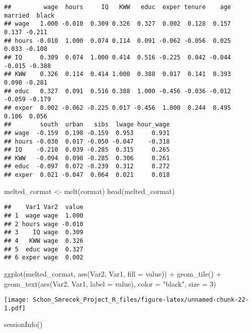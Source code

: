\documentclass[
]{article}
\newenvironment{Shaded}{\begin{snugshade}}{\end{snugshade}}
\newcommand{\AttributeTok}[1]{\textcolor[rgb]{0.77,0.63,0.00}{#1}}
\newcommand{\DecValTok}[1]{\textcolor[rgb]{0.00,0.00,0.81}{#1}}
\newcommand{\FunctionTok}[1]{\textcolor[rgb]{0.00,0.00,0.00}{#1}}
\newcommand{\NormalTok}[1]{#1}
\newcommand{\OtherTok}[1]{\textcolor[rgb]{0.56,0.35,0.01}{#1}}
\newcommand{\SpecialCharTok}[1]{\textcolor[rgb]{0.00,0.00,0.00}{#1}}
\newcommand{\StringTok}[1]{\textcolor[rgb]{0.31,0.60,0.02}{#1}}
\begin{document}
\begin{verbatim}
##         wage  hours     IQ   KWW   educ  exper tenure    age married  black
## wage   1.000 -0.010  0.309 0.326  0.327  0.002  0.128  0.157   0.137 -0.211
## hours -0.010  1.000  0.074 0.114  0.091 -0.062 -0.056  0.025   0.033 -0.108
## IQ     0.309  0.074  1.000 0.414  0.516 -0.225  0.042 -0.044  -0.015 -0.388
## KWW    0.326  0.114  0.414 1.000  0.388  0.017  0.141  0.393   0.090 -0.281
## educ   0.327  0.091  0.516 0.388  1.000 -0.456 -0.036 -0.012  -0.059 -0.179
## exper  0.002 -0.062 -0.225 0.017 -0.456  1.000  0.244  0.495   0.106  0.056
##        south  urban   sibs  lwage hour_wage
## wage  -0.159  0.198 -0.159  0.953     0.931
## hours -0.030  0.017 -0.050 -0.047    -0.318
## IQ    -0.210  0.039 -0.285  0.315     0.265
## KWW   -0.094  0.098 -0.285  0.306     0.261
## educ  -0.097  0.072 -0.239  0.312     0.272
## exper  0.021 -0.047  0.064  0.021     0.018
\end{verbatim}

\begin{Shaded}
\begin{Highlighting}[]
\NormalTok{melted\_cormat }\OtherTok{\textless{}{-}} \FunctionTok{melt}\NormalTok{(cormat)}
\FunctionTok{head}\NormalTok{(melted\_cormat)}
\end{Highlighting}
\end{Shaded}

\begin{verbatim}
##    Var1 Var2  value
## 1  wage wage  1.000
## 2 hours wage -0.010
## 3    IQ wage  0.309
## 4   KWW wage  0.326
## 5  educ wage  0.327
## 6 exper wage  0.002
\end{verbatim}

\begin{Shaded}
\begin{Highlighting}[]
\FunctionTok{ggplot}\NormalTok{(melted\_cormat, }\FunctionTok{aes}\NormalTok{(Var2, Var1, }\AttributeTok{fill =}\NormalTok{ value)) }\SpecialCharTok{+} 
  \FunctionTok{geom\_tile}\NormalTok{() }\SpecialCharTok{+} 
  \FunctionTok{geom\_text}\NormalTok{(}\FunctionTok{aes}\NormalTok{(Var2, Var1, }\AttributeTok{label =}\NormalTok{ value), }\AttributeTok{color =} \StringTok{"black"}\NormalTok{, }\AttributeTok{size =} \DecValTok{3}\NormalTok{) }
\end{Highlighting}
\end{Shaded}

\texttt{[image: Schon\_Smrecek\_Project\_R\_files/figure-latex/unnamed-chunk-22-1.pdf]}

\begin{Shaded}
\begin{Highlighting}[]
\FunctionTok{sessionInfo}\NormalTok{()}
\end{Highlighting}
\end{Shaded}
\end{document}
